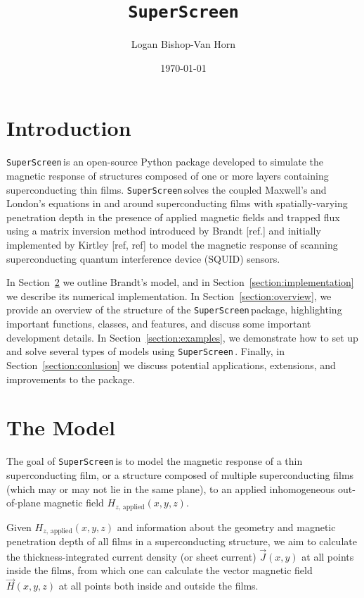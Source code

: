 \documentclass{article}
\title{\texttt{SuperScreen}}
\author{Logan Bishop-Van Horn}
\date{\today}
\newcommand{\SuperScreen}{\texttt{SuperScreen}\,}
\begin{document}
\maketitle

\section{Introduction}
\label{section:introduction}

\SuperScreen is an open-source Python package developed to simulate the magnetic response of structures composed of one or more layers containing superconducting thin films. \SuperScreen solves the coupled Maxwell's and London's equations in and around superconducting films with spatially-varying penetration depth in the presence of applied magnetic fields and trapped flux using a matrix inversion method introduced by Brandt [ref.] and initially implemented by Kirtley [ref, ref] to model the magnetic response of scanning superconducting quantum interference device (SQUID) sensors.

In Section~\ref{section:model} we outline Brandt's model, and in Section~\ref{section:implementation} we describe its numerical implementation. In Section~\ref{section:overview}, we provide an overview of the structure of the \SuperScreen package, highlighting important functions, classes, and features, and discuss some important development details. In Section~\ref{section:examples}, we demonstrate how to set up and solve several types of models using \SuperScreen. Finally, in Section~\ref{section:conlusion} we discuss potential applications, extensions, and improvements to the package.

\section{The Model}
\label{section:model}

The goal of \SuperScreen is to model the magnetic response of a thin superconducting film, or a structure composed of multiple superconducting films (which may or may not lie in the same plane), to an applied inhomogeneous out-of-plane magnetic field
$H_{z,\,\mathrm{applied}}(x, y, z)$.

Given $H_{z,\,\mathrm{applied}}(x, y, z)$ and information about the geometry and magnetic penetration depth of all films in a superconducting structure, we aim to calculate the thickness-integrated current density (or sheet current) $\vec{J}(x, y)$ at all points inside the films, from which one can calculate the vector magnetic field $\vec{H}(x, y, z)$ at all points both inside and outside the films.
\end{document}
